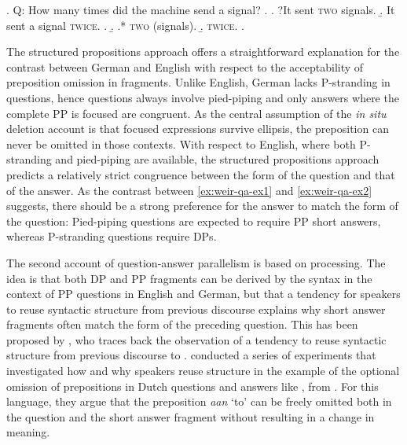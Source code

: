 \ex. \label{ex:weir-qa-ex2}
Q: How many times did the machine send a signal? \hfill \citep[1289]{weir2018}
\a. \a. ?It sent \textsc{two} signals.
    \b. It sent a signal \textsc{twice}.
    \z.
\b.
\a.* \textsc{two} (signals).
\b. \textsc{twice}.
\z.

The structured propositions approach offers a straightforward explanation for the contrast between German and English with respect to the acceptability of preposition omission in fragments. Unlike English, German lacks P-stranding in questions, hence questions always involve pied-piping and only answers where the complete PP is focused are congruent. As the central assumption of the \textit{in situ} deletion account is that focused expressions survive ellipsis, the preposition can never be omitted in those contexts. With respect to English, where both P-stranding and pied-piping are available, the structured propositions approach predicts a relatively strict congruence between the form of the question and that of the answer. As the contrast between \ref{ex:weir-qa-ex1} and \ref{ex:weir-qa-ex2} suggests, there should be a strong preference for the answer to match the form of the question: Pied-piping questions are expected to require PP short answers, whereas P-stranding questions require DPs.

The second account of question-answer parallelism is based on processing. The idea is that both DP and PP fragments can be derived by the syntax in the context of PP questions in English and German, but that a tendency for speakers to reuse syntactic structure from previous discourse explains why short answer fragments often match the form of the preceding question. This has been proposed by \citet{nykiel2017}, who traces back the observation of a tendency to reuse syntactic structure from previous discourse to \citet{levelt.kelter1982}. \citet{levelt.kelter1982} conducted a series of experiments that investigated how and why speakers reuse structure in the example of the optional omission of prepositions in Dutch questions and answers like \Next, from \citet[80]{levelt.kelter1982}. For this language, they argue that the preposition \textit{aan} `to' can be freely omitted both in the question and the short answer fragment without resulting in a change in meaning.

